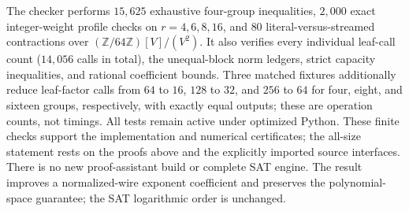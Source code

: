 The checker performs $15{,}625$ exhaustive four-group inequalities,
$2{,}000$ exact integer-weight profile checks on $r=4,6,8,16$, and
$80$ literal-versus-streamed contractions over
$(\mathbb Z/64\mathbb Z)[V]/(V^2)$. It also verifies every individual
leaf-call count ($14{,}056$ calls in total), the unequal-block norm
ledgers, strict capacity inequalities, and rational coefficient bounds.
Three matched fixtures additionally reduce leaf-factor calls from $64$ to $16$,
$128$ to $32$, and $256$ to $64$ for four, eight, and sixteen groups,
respectively, with exactly equal outputs; these are operation counts,
not timings. All tests remain active under optimized Python. These finite checks
support the implementation and numerical certificates; the all-size
statement rests on the proofs above and the explicitly imported source
interfaces. There is no new proof-assistant build or complete SAT engine.
The result improves a normalized-wire exponent coefficient and preserves
the polynomial-space guarantee; the SAT logarithmic order is unchanged.
